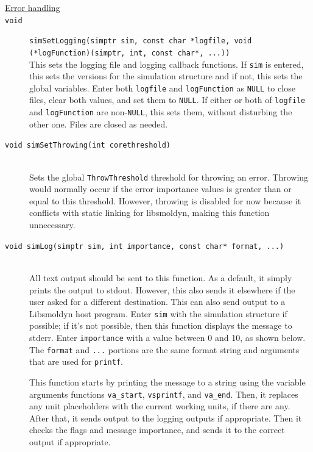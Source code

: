 \documentclass {scrbook}
\newcommand {\ttt} {\texttt}
\begin{document}
\begin{description}

\item[\underline{Error handling}]

\item[\ttt{void}]
\ttt{simSetLogging(simptr sim, const char *logfile, void (*logFunction)(simptr, int, const char*, ...))}
\hfill \\
This sets the logging file and logging callback functions. If \ttt{sim} is entered, this sets the versions for the simulation structure and if not, this sets the global variables. Enter both \ttt{logfile} and \ttt{logFunction} as \ttt{NULL} to close files, clear both values, and set them to \ttt{NULL}. If either or both of \ttt{logfile} and \ttt{logFunction} are non-\ttt{NULL}, this sets them, without disturbing the other one. Files are closed as needed.

\item[\ttt{void simSetThrowing(int corethreshold)}]
\hfill \\
Sets the global \ttt{ThrowThreshold} threshold for throwing an error. Throwing would normally occur if the error importance values is greater than or equal to this threshold. However, throwing is disabled for now because it conflicts with static linking for libsmoldyn, making this function unnecessary.

\item[\ttt{void simLog(simptr sim, int importance, const char* format, ...)}]
\hfill \\
All text output should be sent to this function. As a default, it simply prints the output to stdout. However, this also sends it elsewhere if the user asked for a different destination. This can also send output to a Libsmoldyn host program. Enter \ttt{sim} with the simulation structure if possible; if it's not possible, then this function displays the message to stderr. Enter \ttt{importance} with a value between 0 and 10, as shown below. The \ttt{format} and \ttt{...} portions are the same format string and arguments that are used for \ttt{printf}.

This function starts by printing the message to a string using the variable arguments functions \ttt{va\_start}, \ttt{vsprintf}, and \ttt{va\_end}. Then, it replaces any unit placeholders with the current working units, if there are any. After that, it sends output to the logging outputs if appropriate. Then it checks the flags and message importance, and sends it to the correct output if appropriate.


\end{description}
\end{document}

